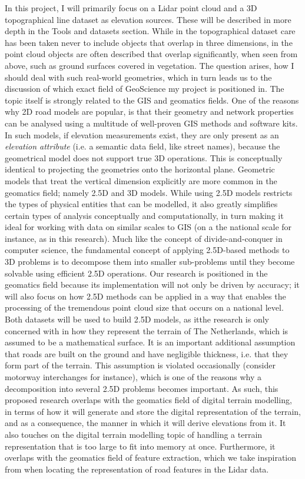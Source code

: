 In this project, I will primarily focus on a Lidar point cloud and a 3D topographical line dataset as elevation sources. These will be described in more depth in the Tools and datasets section. While in the topographical dataset care has been taken never to include objects that overlap in three dimensions, in the point cloud objects are often described that overlap significantly, when seen from above, such as ground surfaces covered in vegetation. The question arises, how I should deal with such real-world geometries, which in turn leads us to the discussion of which exact field of GeoScience my project is positioned in. The topic itself is strongly related to the GIS and geomatics fields. One of the reasons why 2D road models are popular, is that their geometry and network properties can be analysed using a multitude of well-proven GIS methods and software kits. In such models, if elevation measurements exist, they are only present as an \textit{elevation attribute} (i.e. a semantic data field, like street names), because the geometrical model does not support true 3D operations. This is conceptually identical to projecting the geometries onto the horizontal plane. Geometric models that treat the vertical dimension explicitly are more common in the geomatics field; namely 2.5D and 3D models. While using 2.5D models restricts the types of physical entities that can be modelled, it also greatly simplifies certain types of analysis conceptually and computationally, in turn making it ideal for working with data on similar scales to GIS (on a the national scale for instance, as in this research). Much like the concept of divide-and-conquer in computer science, the fundamental concept of applying 2.5D-based methods to 3D problems is to decompose them into smaller sub-problems until they become solvable using efficient 2.5D operations. Our research is positioned in the geomatics field because its implementation will not only be driven by accuracy; it will also focus on how 2.5D methods can be applied in a way that enables the processing of the tremendous point cloud size that occurs on a national level. Both datasets will be used to build 2.5D models, as itthe research is only concerned with in how they  represent the terrain of The Netherlands, which is assumed to be a mathematical surface. It is an important additional assumption that roads are built on the ground and have negligible thickness, i.e. that they form part of the terrain. This assumption is violated occasionally (consider motorway interchanges for instance), which is one of the reasons why a decomposition into several 2.5D problems becomes important. As such, this proposed research overlaps with the geomatics field of digital terrain modelling, in terms of how it will generate and store the digital representation of the terrain, and as a consequence, the manner in which it will derive elevations from it. It also touches on the digital terrain modelling topic of handling a terrain representation that is too large to fit into memory at once. Furthermore, it overlaps with the geomatics field of feature extraction, which we take inspiration from when locating the representation of road features in the Lidar data.






